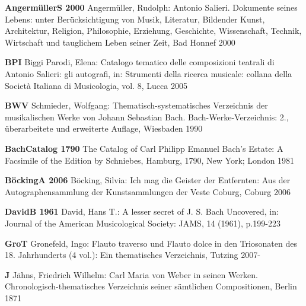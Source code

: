 \documentclass[a4paper, twocolumn, 11pt]{book}
\begin{document}
  \textbf{AngermüllerS 2000}\hspace{10pt}
  Angermüller, Rudolph: Antonio Salieri. Dokumente seines Lebens: unter Berücksichtigung von Musik, Literatur, Bildender Kunst, Architektur, Religion, Philosophie, Erziehung, Geschichte, Wissenschaft, Technik, Wirtschaft und tauglichem Leben seiner Zeit, Bad Honnef 2000 \newline 


  \textbf{BPI}\hspace{10pt}
  Biggi Parodi, Elena: Catalogo tematico delle composizioni teatrali di Antonio Salieri: gli autografi, in: Strumenti della ricerca musicale: collana della Società Italiana di Musicologia, vol. 8, Lucca 2005 \newline 


  \textbf{BWV}\hspace{10pt}
  Schmieder, Wolfgang: Thematisch-systematisches Verzeichnis der musikalischen Werke von Johann Sebastian Bach. Bach-Werke-Verzeichnis: 2., überarbeitete und erweiterte Auflage, Wiesbaden 1990 \newline 


  \textbf{BachCatalog 1790}\hspace{10pt}
  The Catalog of Carl Philipp Emanuel Bach's Estate: A Facsimile of the Edition by Schniebes, Hamburg, 1790, New York; London 1981 \newline 


  \textbf{BöckingA 2006}\hspace{10pt}
  Böcking, Silvia: Ich mag die Geister der Entfernten: Aus der Autographensammlung der Kunstsammlungen der Veste Coburg, Coburg 2006 \newline 


  \textbf{DavidB 1961}\hspace{10pt}
  David, Hans T.: A lesser secret of J. S. Bach Uncovered, in: Journal of the American Musicological Society: JAMS, 14 (1961), p.199-223 \newline 


  \textbf{GroT}\hspace{10pt}
  Gronefeld, Ingo: Flauto traverso und Flauto dolce in den Triosonaten des 18. Jahrhunderts (4 vol.): Ein thematisches Verzeichnis, Tutzing 2007- \newline 


  \textbf{J}\hspace{10pt}
  Jähns, Friedrich Wilhelm: Carl Maria von Weber in seinen Werken. Chronologisch-thematisches Verzeichnis seiner sämtlichen Compositionen, Berlin 1871 \newline 
\end{document}
